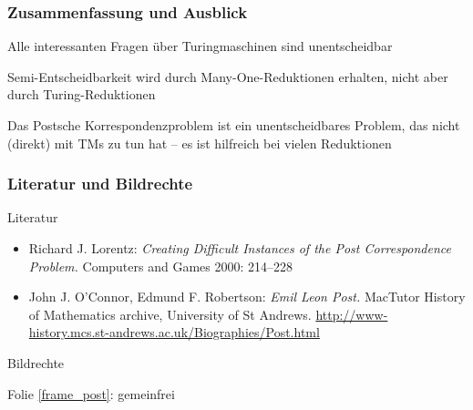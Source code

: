 \documentclass[aspectratio=1610,onlymath]{beamer}
\begin{document}
\begin{frame}\frametitle{Zusammenfassung und Ausblick}

Alle interessanten Fragen über Turingmaschinen sind unentscheidbar\bigskip

\alert{Semi-Entscheidbarkeit} wird durch Many-One-Reduktionen erhalten, nicht aber durch Turing-Reduktionen\bigskip

Das \alert{Postsche Korrespondenzproblem} ist ein unentscheidbares Problem, das nicht (direkt) mit TMs zu tun hat -- es ist hilfreich bei vielen Reduktionen\bigskip


\end{frame}

\begin{frame}[t]\frametitle{Literatur und Bildrechte}

\alert{Literatur}\bigskip

\begin{itemize}
\item Richard J. Lorentz:
\emph{Creating Difficult Instances of the Post Correspondence Problem.}
Computers and Games 2000: 214--228
\item John J. O'Connor, Edmund F. Robertson: \emph{Emil Leon Post.} MacTutor History of Mathematics archive, University of St Andrews. \url{http://www-history.mcs.st-andrews.ac.uk/Biographies/Post.html}
\end{itemize}

\bigskip\bigskip

\alert{Bildrechte}\bigskip

Folie \ref{frame_post}: gemeinfrei

\end{frame}
\end{document}
